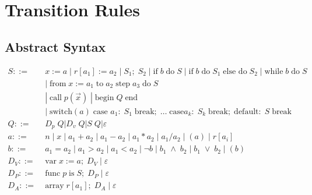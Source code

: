 


\chapter{Transition Rules}
\label{app:TransitionRules}

\section{Abstract Syntax}
\begin{align*}
S::= \; & x := a \; | \; r[a_1] := a_2 \; | \; S_1; \; S_2 \; | \; \text{if} \; b \; \text{do} \; S \; | \; \text{if} \; b \; \text{do} \; S_1 \; \text{else do} \; S_2 \; | \; \text{while} \; b \; \text{do} \; S \\
~ & | \; \text{from} \; x := a_1 \; \text{to} \; a_2 \; \text{step} \; a_3 \; \text{do} \; S \\
~ & | \; \text{call} \; p(\vec{x}) \; | \; \text{begin} \; Q \; \text{end} \;\\
~ & | \; \text{switch}(a) \; \text{case } a_1: \; S_1 \; \text{break}; \; \dots \; \text{case} a_k: \; S_k \; \text{break}; \; \text{default}: \; S \; \text{break} \\
Q::= \; & D_p \; Q | D_v \; Q | S \; Q | \varepsilon \\
a::= \; & n \; | \; x \; | \; a_1 + a_2 \; | \; a_1 - a_2 \; | \; a_1 * a_2 \; | \; a_1 / a_2 \; | \; (a) \; | \; r[a_i]\\
b::= \; &a_1 = a_2 \; | \; a_1 > a_2 \; | \; a_1 < a_2 \; | \; \neg b \; | \; b_1 \; \wedge \; b_2 \; | \; b_1 \; \vee \; b_2 \; | \; (b)\\
D_V::= \; & \text{var} \; x := a; \; D_V \; | \; \varepsilon \\
D_P::= \; & \text{func} \; p \; \text{is} \; S;\;  D_P \; | \; \varepsilon \\
D_A::= \; & \text{array} \; r[a_1]; \; D_A \; | \; \varepsilon \\
\end{align*}


